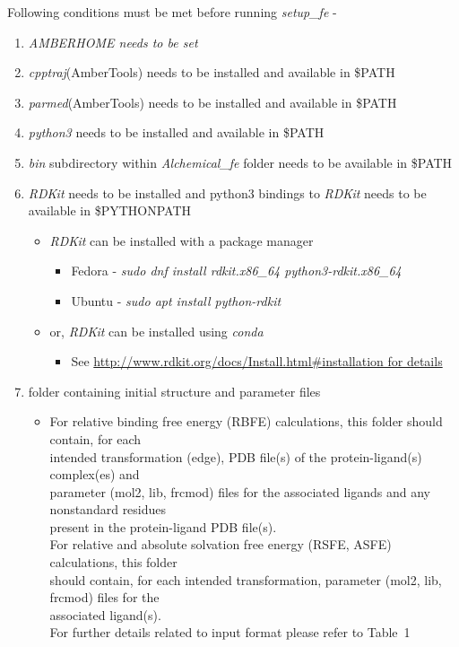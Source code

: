 \documentclass[11pt,letterpaper,titlepage]{article}
\begin{document}
Following conditions must be met before running \textit{setup\_fe} -
\renewcommand{\labelenumi}{\Roman{enumi}}
\begin{enumerate}
	\item {\textit{AMBERHOME needs to be set}}
	\item{\textit{cpptraj}(AmberTools) needs to be installed and available in \$PATH}
	\item{\textit{parmed}(AmberTools) needs to be installed and available in \$PATH}
	\item{\textit{python3} needs to be installed and available in \$PATH}
	\item{\textit{bin} subdirectory within \textit{Alchemical\_fe} folder needs to be available in \$PATH}
	\item{\textit{RDKit} needs to be installed and python3 bindings to \textit{RDKit} needs to be available in \$PYTHONPATH}
	\begin{itemize}
		\item{\textit{RDKit} can be installed with a package manager}
		\begin{itemize}
			\item{Fedora - \textit{sudo dnf install rdkit.x86\_64 python3-rdkit.x86\_64}}
			\item{Ubuntu - \textit{sudo apt install python-rdkit}}
		\end{itemize}
		\item{or, \textit{RDKit} can be installed using \textit{conda}}
		\begin{itemize}
			\item{See \url{http://www.rdkit.org/docs/Install.html\#installation for details}}
		\end{itemize}
	\end{itemize}
	\item{folder containing initial structure and parameter files}
		\begin{itemize}
			\item For relative binding free energy (RBFE) calculations, this folder should contain, for each \\
				intended transformation (edge), PDB file(s) of the protein-ligand(s) complex(es) and  \\
				parameter (mol2, lib, frcmod) files for the associated ligands and any nonstandard residues  \\
				present in the protein-ligand PDB file(s).  \\
				For relative and absolute solvation free energy (RSFE, ASFE) calculations, this folder \\
				should contain, for each intended transformation, parameter (mol2, lib, frcmod) files for the  \\
				associated ligand(s). \\
				For further details related to input format please refer to Table~1 \\
		\end{itemize}
\end{enumerate}
\end{document}

